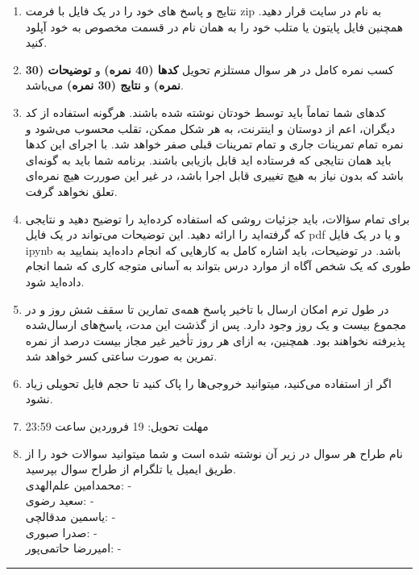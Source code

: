 \documentclass[a4paper]{article}
\begin{document}
\begin{enumerate}
	\item 
نتایج و پاسخ های خود را در یک فایل با فرمت zip به نام
 در سایت  
\href{https://quera.org/course/add_to_course/course/10598/}{} 
 قرار دهید. همچنین فایل پایتون یا متلب خود را به همان نام در قسمت مخصوص به خود آپلود کنید.
\item 
کسب نمره کامل در هر سوال مستلزم تحویل  
\textbf{کدها (40 نمره)}
 و
\textbf{توضیحات (30 نمره)}
و
\textbf{نتایج (30 نمره)}
 می‌باشد. 
\item 
کدهای شما تماماً باید توسط خودتان نوشته شده باشند. هرگونه استفاده از کد دیگران، اعم از دوستان و اینترنت، به هر شکل ممکن، تقلب محسوب می‌شود و نمره تمام تمرینات جاری و تمام تمرینات قبلی صفر خواهد شد. با اجرای این کدها باید همان نتایجی که فرستاده اید قابل بازیابی باشند. برنامه شما باید به گونه‌ای باشد که بدون نیاز به هیچ تغییری قابل اجرا باشد، در غیر این‌ صوررت هیچ نمره‌ای تعلق نخواهد گرفت. 
\item 
برای تمام سؤالات، باید جزئیات روشی که استفاده کرده‌اید را توضیح دهید و نتایجی که گرفته‌اید را ارائه دهید. این توضیحات می‌تواند در یک فایل  pdf  و یا در یک فایل  ipynb باشد. در توضیحات، باید اشاره کامل به کارهایی که انجام داده‌اید بنمایید به طوری که یک شخص آگاه از موارد درس بتواند به آسانی متوجه کاری که شما انجام داده‌اید شود.
\item 
در طول ترم امکان ارسال با تاخیر پاسخ  همه‌ی تمارین تا سقف شش روز و در مجموع بیست و یک روز وجود دارد. پس از گذشت این مدت، پاسخ‌های ارسال‌شده پذیرفته نخواهند بود. همچنین، به ازای هر روز تأخیر غیر مجاز  بیست درصد از نمره تمرین به صورت ساعتی کسر خواهد شد.
\item 
 اگر از
 استفاده می‌کنید، میتوانید خروجی‌ها‌ را پاک کنید تا حجم فایل تحویلی زیاد نشود.
\item 
مهلت تحویل: 19 فروردین ساعت 23:59 
\item 
نام طراح هر سوال در زیر آن نوشته شده است و شما میتوانید سوالات خود را از طریق ایمیل یا تلگرام از طراح سوال بپرسید.
\\
محمدامین علم‌الهدی:  - 
\\
سعید رضوی:  - 
\\
یاسمین مدقالچی:  - 
\\
صدرا صبوری:  - 
\\
امیررضا حاتمی‌پور:  - 
\end{enumerate}
\rule[0.1\baselineskip]{\textwidth}{1pt}
\end{document}
